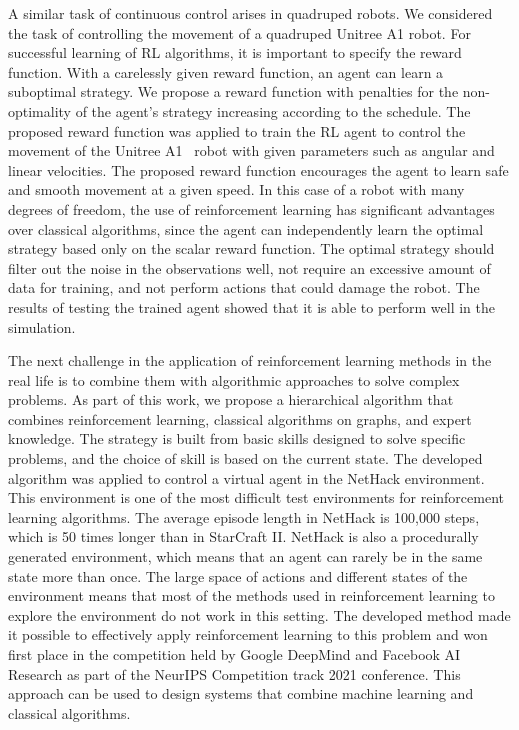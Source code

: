 A similar task of continuous control arises in quadruped robots. We considered the task of controlling the movement of a quadruped Unitree A1 robot\cite{rl_unitree}. For successful learning of RL algorithms, it is important to specify the reward function. With a carelessly given reward function, an agent can learn a suboptimal strategy. We propose a reward function with penalties for the non-optimality of the agent's strategy increasing according to the schedule. The proposed reward function was applied to train the RL agent to control the movement of the Unitree A1~\cite{unitree} robot with given parameters such as angular and linear velocities. The proposed reward function encourages the agent to learn safe and smooth movement at a given speed. In this case of a robot with many degrees of freedom, the use of reinforcement learning has significant advantages over classical algorithms, since the agent can independently learn the optimal strategy based only on the scalar reward function. The optimal strategy should filter out the noise in the observations well, not require an excessive amount of data for training, and not perform actions that could damage the robot. The results of testing the trained agent showed that it is able to perform well in the simulation.

The next challenge in the application of reinforcement learning methods in the real life is to combine them with algorithmic approaches to solve complex problems. As part of this work, we propose a hierarchical algorithm that combines reinforcement learning, classical algorithms on graphs, and expert knowledge. The strategy is built from basic skills designed to solve specific problems, and the choice of skill is based on the current state. The developed algorithm was applied to control a virtual agent in the NetHack \cite{nethack} environment. This environment is one of the most difficult test environments for reinforcement learning algorithms. The average episode length in NetHack is 100,000 steps, which is 50 times longer than in StarCraft II. NetHack is also a procedurally generated environment, which means that an agent can rarely be in the same state more than once. The large space of actions and different states of the environment means that most of the methods used in reinforcement learning to explore the environment do not work in this setting. The developed method made it possible to effectively apply reinforcement learning to this problem and won first place in the competition held by Google DeepMind and Facebook AI Research as part of the NeurIPS Competition track 2021 conference. This approach can be used to design systems that combine machine learning and classical algorithms.

